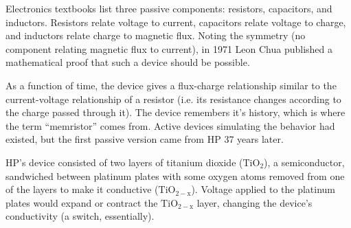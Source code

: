 \documentclass[12pt]{article}
\begin{document}


Electronics textbooks list three passive components: resistors, capacitors, and
inductors.  Resistors relate voltage to current, capacitors relate voltage to
charge, and inductors relate charge to magnetic flux.  Noting the symmetry (no
component relating magnetic flux to current), in 1971 Leon Chua published a
mathematical proof\cite{chua1971} that such a device should be possible.

As a function of time, the device gives a flux-charge relationship similar to
the current-voltage relationship of a resistor (i.e. its resistance changes
according to the charge passed through it).  The device remembers it's history,
which is where the term ``memristor'' comes from.  Active devices simulating
the behavior had existed, but the first passive version came from HP 37 years
later.\cite{strukov2008missing}

HP's device consisted of two layers of titanium dioxide ($\mathrm{TiO_2}$), a
semiconductor, sandwiched between platinum plates with some oxygen atoms
removed from one of the layers to make it conductive ($\mathrm{TiO_{2-x}}$).
Voltage applied to the platinum plates would expand or contract the
$\mathrm{TiO_{2-x}}$ layer, changing the device's
conductivity\cite{williams2008we} (a switch, essentially).
\end{document}
